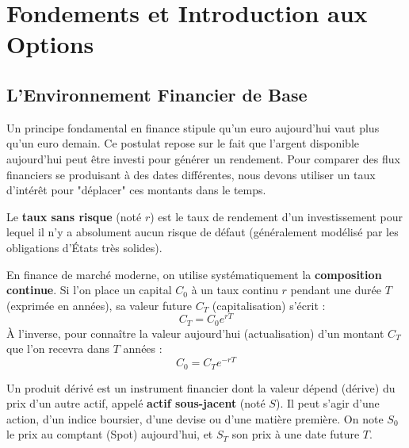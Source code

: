 \newpage
\section{Fondements et Introduction aux Options}

\subsection{L'Environnement Financier de Base}

\begin{intuitionbox}
Un principe fondamental en finance stipule qu'un euro aujourd'hui vaut plus qu'un euro demain. Ce postulat repose sur le fait que l'argent disponible aujourd'hui peut être investi pour générer un rendement. Pour comparer des flux financiers se produisant à des dates différentes, nous devons utiliser un taux d'intérêt pour "déplacer" ces montants dans le temps.
\end{intuitionbox}

\begin{definitionbox}
Le \textbf{taux sans risque} (noté $r$) est le taux de rendement d'un investissement pour lequel il n'y a absolument aucun risque de défaut (généralement modélisé par les obligations d'États très solides). 

En finance de marché moderne, on utilise systématiquement la \textbf{composition continue}. Si l'on place un capital $C_0$ à un taux continu $r$ pendant une durée $T$ (exprimée en années), sa valeur future $C_T$ (capitalisation) s'écrit :
\begin{equation*}
    C_T = C_0 e^{rT}
\end{equation*}
À l'inverse, pour connaître la valeur aujourd'hui (actualisation) d'un montant $C_T$ que l'on recevra dans $T$ années :
\begin{equation*}
    C_0 = C_T e^{-rT}
\end{equation*}
\end{definitionbox}

\begin{definitionbox}
Un produit dérivé est un instrument financier dont la valeur dépend (dérive) du prix d'un autre actif, appelé \textbf{actif sous-jacent} (noté $S$). Il peut s'agir d'une action, d'un indice boursier, d'une devise ou d'une matière première. 
On note $S_0$ le prix au comptant (Spot) aujourd'hui, et $S_T$ son prix à une date future $T$.
\end{definitionbox}


